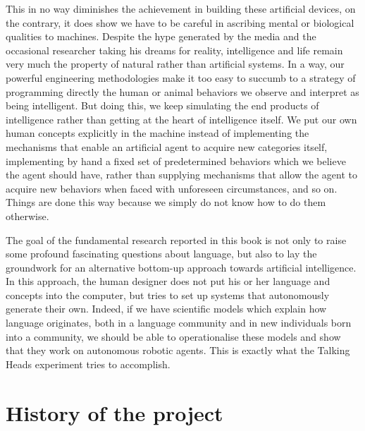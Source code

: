 This in no way diminishes the achievement in
building these artificial devices, on the contrary, it
does show we have to be careful in ascribing mental or biological
qualities to machines. Despite the hype generated by the
media and the occasional researcher taking his dreams for reality, 
intelligence and life remain very much the property of
natural rather than artificial systems. In a way, our
powerful engineering methodologies make it too easy to 
succumb to a strategy of programming directly the human or animal 
behaviors we observe and interpret as being 
intelligent. But doing this, we keep simulating 
the end products of intelligence rather than getting at the heart of 
intelligence itself. We put our own human concepts explicitly
in the machine instead of implementing the mechanisms that
enable an artificial agent to acquire new categories itself, 
implementing by hand a fixed set of predetermined behaviors which 
we believe the agent should have, 
rather than supplying mechanisms that allow the agent to acquire new 
behaviors when faced with unforeseen circumstances, 
and so on. Things are done this way because we simply 
do not know how to do them otherwise. 

The goal of the fundamental research
reported in this book is not only to raise some 
profound fascinating questions about language, but also to lay 
the groundwork for an alternative bottom-up approach towards
artificial intelligence. In this approach, the human 
designer does not put his or her language and 
concepts into the computer, but tries to set up systems that
autonomously generate their own. Indeed, if we have scientific
models which explain how language originates, both in a language
community and in new individuals born 
into a community, we should be able to operationalise 
these models and show that they work on autonomous robotic
agents. This is exactly what the Talking Heads experiment
tries to accomplish. 

\section{History of the project}

